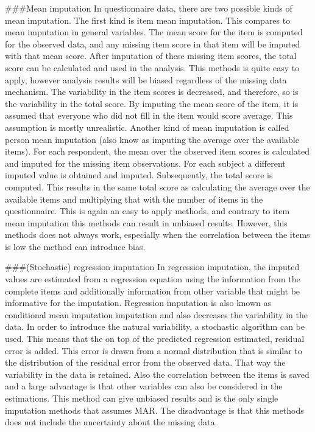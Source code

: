 \documentclass[
]{book}
\begin{document}
\#\#\#Mean imputation In questionnaire data, there are two possible
kinds of mean imputation. The first kind is item mean imputation. This
compares to mean imputation in general variables. The mean score for the
item is computed for the observed data, and any missing item score in
that item will be imputed with that mean score. After imputation of
these missing item scores, the total score can be calculated and used in
the analysis. This methods is quite easy to apply, however analysis
results will be biased regardless of the missing data mechanism. The
variability in the item scores is decreased, and therefore, so is the
variability in the total score. By imputing the mean score of the item,
it is assumed that everyone who did not fill in the item would score
average. This assumption is mostly unrealistic. Another kind of mean
imputation is called person mean imputation (also know as imputing the
average over the available items). For each respondent, the mean over
the observed item scores is calculated and imputed for the missing item
observations. For each subject a different imputed value is obtained and
imputed. Subsequently, the total score is computed. This results in the
same total score as calculating the average over the available items and
multiplying that with the number of items in the questionnaire. This is
again an easy to apply methods, and contrary to item mean imputation
this methods can result in unbiased results. However, this methods does
not always work, especially when the correlation between the items is
low the method can introduce bias.

\#\#\#(Stochastic) regression imputation In regression imputation, the
imputed values are estimated from a regression equation using the
information from the complete items and additionally information from
other variable that might be informative for the imputation. Regression
imputation is also known as conditional mean imputation imputation and
also decreases the variability in the data. In order to introduce the
natural variability, a stochastic algorithm can be used. This means that
the on top of the predicted regression estimated, residual error is
added. This error is drawn from a normal distribution that is similar to
the distribution of the residual error from the observed data. That way
the variability in the data is retained. Also the correlation between
the items is saved and a large advantage is that other variables can
also be considered in the estimations. This method can give unbiased
results and is the only single imputation methods that assumes MAR. The
disadvantage is that this methods does not include the uncertainty about
the missing data.
\end{document}
